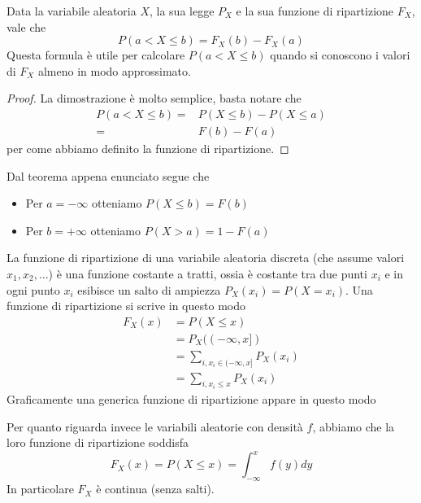 \begin{theorem}\label{th: diff_cdf}
	Data la variabile aleatoria $X$, la sua legge $P_X$ e la sua funzione di ripartizione $F_X$,
	vale che
	\[ P(a < X \leq b) = F_X (b) - F_X(a) \]
	Questa formula è utile per calcolare $P(a < X \leq b)$ quando si conoscono i valori di $F_X$
	almeno in modo approssimato.
	\begin{proof}
		La dimostrazione è molto semplice, basta notare che
		\begin{align*}
			P(a < X \leq b) = & P(X \leq b) - P(X \leq a) \\
			=                 & F(b) - F(a)
		\end{align*}
		per come abbiamo definito la funzione di ripartizione.
	\end{proof}
\end{theorem}

\begin{observation}
	Dal teorema appena enunciato segue che
	\begin{itemize}
		\item Per $a = -\infty$ otteniamo $P(X \leq b) = F(b)$
		\item Per $b = +\infty$ otteniamo $P(X > a) = 1 - F(a)$
	\end{itemize}
\end{observation}

La funzione di ripartizione di una variabile aleatoria discreta (che assume valori
$x_1, x_2, \dots$) è una funzione costante a tratti, ossia è costante tra due punti $x_i$ e in ogni
punto $x_i$ esibisce un salto di ampiezza $P_X(x_i) = P(X = x_i)$. Una funzione di ripartizione
si scrive in questo modo
\begin{align*}
	F_X(x) & = P(X \leq x)                              \\
	       & = P_X ((-\infty, x])                       \\
	       & = \sum_{i, x_i \in (-\infty, x]} P_X (x_i) \\
	       & = \sum_{i, x_i \leq x} P_X (x_i)
\end{align*}
Graficamente una generica funzione di ripartizione appare in questo modo
\begin{center}
\end{center}
Per quanto riguarda invece le variabili aleatorie con densità $f$, abbiamo che la loro funzione di
ripartizione soddisfa
\[ F_X(x) = P(X \leq x) = \int_{-\infty}^x f(y) dy \]
In particolare $F_X$ è continua (senza salti).


